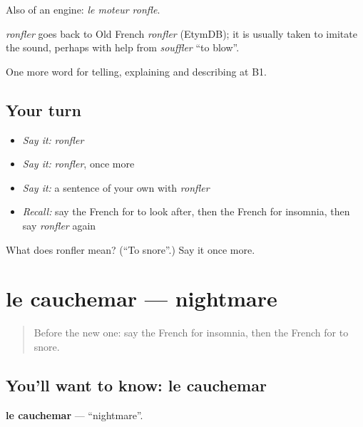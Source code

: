 Also of an engine: \emph{le moteur ronfle}.

\begin{cousinweb}
\emph{ronfler} goes back to Old French \emph{ronfler} (EtymDB); it is usually taken to imitate the sound, perhaps with help from \emph{souffler} \textquotedblleft{}to blow\textquotedblright{}.
\end{cousinweb}

\begin{grammarlens}[title={What you've built}]
One more word for telling, explaining and describing at B1.
\end{grammarlens}

\subsection*{Your turn}
\begin{itemize}
\raggedright
  \item \emph{Say it:} \emph{ronfler}
  \item \emph{Say it:} \emph{ronfler}, once more
  \item \emph{Say it:} a sentence of your own with \emph{ronfler}
  \item \emph{Recall:} say the French for to look after, then the French for insomnia, then say \emph{ronfler} again
\end{itemize}

\begin{tcolorbox}[breakable,colback=teal!4,colframe=teal!35!black,title={Before you move on}]
What does ronfler mean? (\textquotedblleft{}To snore\textquotedblright{}.) Say it once more.
\end{tcolorbox}
\section[le cauchemar]{le cauchemar — nightmare}

\label{lesson:FR-C486-cauchemar}



\begin{quote}
Before the new one: say the French for insomnia, then the French for to snore.
\end{quote}

\subsection*{You'll want to know: le cauchemar}
\textbf{le cauchemar} — \textquotedblleft{}nightmare\textquotedblright{}.

